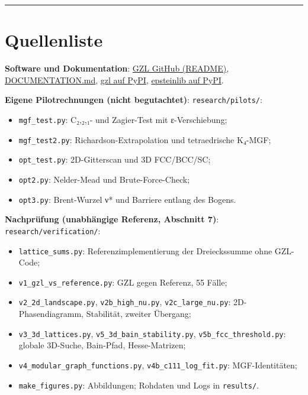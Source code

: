 \begin{center}\rule{0.5\linewidth}{0.5pt}\end{center}

\section{Quellenliste}

\textbf{Software und Dokumentation}: \href{https://github.com/graph-zeta/gzl}{GZL GitHub (README)}, \href{https://github.com/graph-zeta/gzl/blob/main/DOCUMENTATION.md}{DOCUMENTATION.md}, \href{https://pypi.org/project/gzl/}{gzl auf PyPI}, \href{https://pypi.org/project/epsteinlib/}{epsteinlib auf PyPI}.

\textbf{Eigene Pilotrechnungen (nicht begutachtet)}: \texttt{research/pilots/}:

\begin{itemize}
\tightlist
\item
  \texttt{mgf\_test.py}: C₂,₂,₁- und Zagier-Test mit ε-Verschiebung;
\item
  \texttt{mgf\_test2.py}: Richardson-Extrapolation und tetraedrische K₄-MGF;
\item
  \texttt{opt\_test.py}: 2D-Gitterscan und 3D FCC/BCC/SC;
\item
  \texttt{opt2.py}: Nelder-Mead und Brute-Force-Check;
\item
  \texttt{opt3.py}: Brent-Wurzel ν* und Barriere entlang des Bogens.
\end{itemize}

\textbf{Nachprüfung (unabhängige Referenz, Abschnitt 7)}: \texttt{research/verification/}:

\begin{itemize}
\tightlist
\item
  \texttt{lattice\_sums.py}: Referenzimplementierung der Dreieckssumme ohne GZL-Code;
\item
  \texttt{v1\_gzl\_vs\_reference.py}: GZL gegen Referenz, 55 Fälle;
\item
  \texttt{v2\_2d\_landscape.py}, \texttt{v2b\_high\_nu.py}, \texttt{v2c\_large\_nu.py}: 2D-Phasendiagramm, Stabilität, zweiter Übergang;
\item
  \texttt{v3\_3d\_lattices.py}, \texttt{v5\_3d\_bain\_stability.py}, \texttt{v5b\_fcc\_threshold.py}: globale 3D-Suche, Bain-Pfad, Hesse-Matrizen;
\item
  \texttt{v4\_modular\_graph\_functions.py}, \texttt{v4b\_c111\_log\_fit.py}: MGF-Identitäten;
\item
  \texttt{make\_figures.py}: Abbildungen; Rohdaten und Logs in \texttt{results/}.
\end{itemize}

